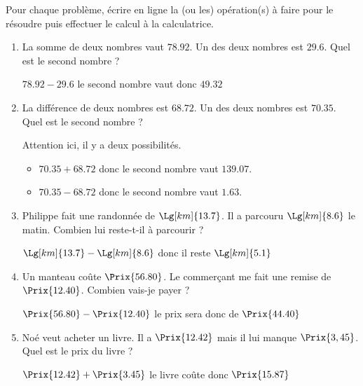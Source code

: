\begin{corrige}
    Pour chaque problème, écrire en ligne la (ou les) opération(s) à faire pour le résoudre puis effectuer le calcul à la calculatrice.
    \begin{enumerate}
       \item La somme de deux nombres vaut $\num{78.92}$. Un des deux nombres est $\num{29.6}$. Quel est le second nombre ?
       
       {\red $\num{78.92} - \num{29.6}$ le second nombre vaut donc $\num{49.32}$}
       \item La différence de deux nombres est $\num{68.72}$. Un des deux nombres est $\num{70.35}$. Quel est le second nombre ?
       
       {\red Attention ici, il y a deux possibilités.
       \begin{itemize}
        \item $\num{70.35} + \num{68.72}$ donc le second nombre vaut $\num{139.07}$.
        \item $\num{70.35} - \num{68.72}$ donc le second nombre vaut $\num{1.63}$.
       \end{itemize}       
       }
       \item Philippe fait une randonnée de $\Lg[km]{13.7}$. Il a parcouru $\Lg[km]{8.6}$ le matin.
        Combien lui reste-t-il à parcourir ?

        {\red $\Lg[km]{13.7} - \Lg[km]{8.6}$ donc il reste $\Lg[km]{5.1}$}
       \item Un manteau coûte $\Prix{56.80}$. Le commerçant me fait une remise de $\Prix{12.40}$. Combien vais-je payer ?
       
       {\red $\Prix{56.80} - \Prix{12.40}$ le prix sera donc de $\Prix{44.40}$}
       \item Noé veut acheter un livre. Il a $\Prix{12.42}$ mais il lui manque $\Prix{3,45}$. Quel est le prix du livre ?   
       
       {\red $\Prix{12.42} + \Prix{3.45}$ le livre coûte donc $\Prix{15.87}$}
    \end{enumerate}
\end{corrige}
